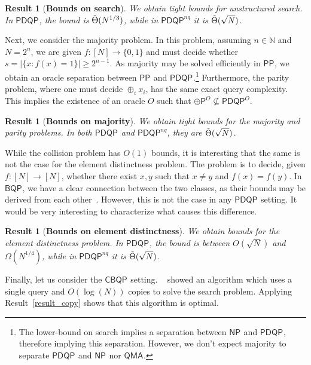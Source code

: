 \documentclass[10pt,a4paper]{article}
\newcommand{\nonadaptivelabel}[0]{\ensuremath{nq}\xspace}
\newcommand{\compclass}[2][]{\ensuremath{\mathsf{#2}^{#1}}\xspace}
\newcommand{\pdqpname}[0]{\compclass{PDQP}}
\newcommand{\pdqpnaqname}[0]{\compclass[\nonadaptivelabel]{PDQP}}
\newcommand{\bqpname}[0]{\compclass{BQP}}
\newcommand{\copybqpname}[0]{\compclass{CBQP}}
\newtheorem{result}[theorem]{Result}
\begin{document}
\begin{result}[\textbf{Bounds on search}]
    We obtain tight bounds for unstructured search. In \pdqpname, the bound is $\Tilde{\Theta}(N^{1/3})$, while in \pdqpnaqname it is $\Tilde{\Theta}(\sqrt{N})$.
\end{result}

Next, we consider the majority problem. In this problem, assuming $n\in \mathbb{N}$ and $N=2^n$, we are given $f:[N]\rightarrow \{0,1\}$ and must decide whether $s=|\{x: f(x)=1\}| \geq 2^{n-1}$. As majority may be solved efficiently in \compclass{PP}, we obtain an oracle separation between \compclass{PP} and \pdqpname.\footnote{The lower-bound on search implies a separation between \compclass{NP} and \pdqpname, therefore implying this separation. However, we don't expect majority to separate \pdqpname and \compclass{NP} nor \compclass{QMA}.} Furthermore, the parity problem, where one must decide $\oplus_i x_i$, has the same exact query complexity. This implies the existence of an oracle $O$ such that $\compclass[O]{\oplus P}\not\subseteq \compclass[O]{PDQP}$.

\begin{result}[\textbf{Bounds on majority}]
    We obtain tight bounds for the majority and parity problems. In both \pdqpname and \pdqpnaqname, they are $\Tilde{\Theta}(\sqrt{N})$.
\end{result}

While the collision problem has $O(1)$ bounds, it is interesting that the same is not the case for the element distinctness problem. The problem is to decide, given $f:[N]\rightarrow [N]$, whether there exist $x,y$ such that $x\neq y$ and $f(x)=f(y)$. In \bqpname, we have a clear connection between the two classes, as their bounds may be derived from each other~\cite{childs_lecture_notes}. However, this is not the case in any \pdqpname setting. It would be very interesting to characterize what causes this difference. 

\begin{result}[\textbf{Bounds on element distinctness}]
    We obtain bounds for the element distinctness problem. In \pdqpname, the bound is between $O(\sqrt{N})$ and $\Omega(N^{1/4})$, while in \pdqpnaqname it is $\Tilde{\Theta}(\sqrt{N})$.
\end{result}

Finally, let us consider the \copybqpname setting. ~\cite{grover_search_no_signaling_principle} showed an algorithm which uses a single query and $O(\log(N))$ copies to solve the search problem. Applying Result~\ref{result_copy} shows that this algorithm is optimal.
\end{document}
